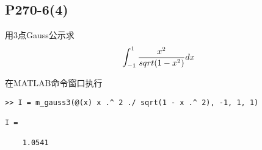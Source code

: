 \subsection{P270-6(4)}

\renewcommand{\FX}{\frac{x^2}{sqrt(1-x^2)}}
\renewcommand{\LRANGE}{-1}
\renewcommand{\RRANGE}{1}

用3点Gauss公示求
\begin{displaymath}
\INTRANGE{\FX}{x}
\end{displaymath}

\begin{SOLVE}
在MATLAB命令窗口执行
\begin{lstlisting}
>> I = m_gauss3(@(x) x .^ 2 ./ sqrt(1 - x .^ 2), -1, 1, 1)

I =

    1.0541

\end{lstlisting}
\end{SOLVE}